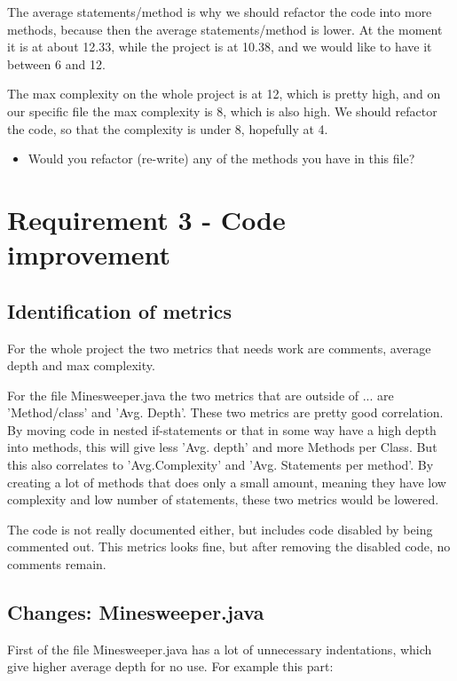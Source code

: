 \documentclass[UKenglish]{article}  %
\begin{document}
The average statements/method is why we should refactor the code into more methods, because then the average statements/method is lower. At the moment it is at about 12.33, while the project is at 10.38, and we would like to have it between 6 and 12. 

The max complexity on the whole project is at 12, which is pretty high, and on our specific file the max complexity is 8, which is also high. We should refactor the code, so that the complexity is under 8, hopefully at 4. 


\begin{itemize}
\item Would you refactor (re-write) any of the methods you have in this file?
\end{itemize}

\section{Requirement 3 - Code improvement}
\subsection{Identification of metrics}
For the whole project the two metrics that needs work are comments, average
depth and max complexity. 

For the file Minesweeper.java the two metrics that are outside of ... are 
'Method/class' and 'Avg. Depth'. These two metrics are pretty good correlation.
By moving code in nested if-statements or that in some way have a high depth 
into methods, this will give less 'Avg. depth' and more Methods per Class. 
But this also correlates to 'Avg.Complexity' and 'Avg. Statements per method'.
By creating a lot of methods that does only a small amount, meaning they have
low complexity and low number of statements, these two metrics would be lowered.

The code is not really documented either, but includes code disabled by being
commented out. This metrics looks fine, but after removing the disabled code,
no comments remain.

\subsection{Changes: Minesweeper.java}
First of the file Minesweeper.java has a lot of unnecessary indentations, which
give higher average depth for no use. For example this part:


\end{document}
